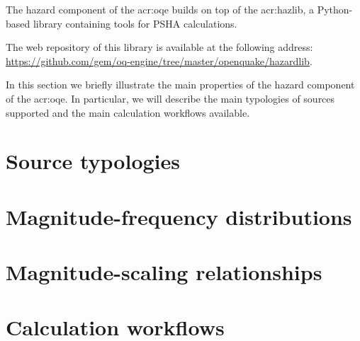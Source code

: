 
The hazard component of the \glsdesc{acr:oqe} builds on top of the
\gls{acr:hazlib}, a Python-based library containing tools for PSHA
calculations.

The web repository of this library is available at the following address:\\
\href{https://github.com/gem/oq-engine/tree/master/openquake/hazardlib}{https://github.com/gem/oq-engine/tree/master/openquake/hazardlib}.

In this section we briefly illustrate the main properties of the hazard
component of the \glsdesc{acr:oqe}. In particular, we will describe the main
typologies of sources supported and the main calculation workflows available.


\section{Source typologies}
\label{sec:source_typologies}


\section{Magnitude-frequency distributions}
\label{sec:mfd_list}


\section{Magnitude-scaling relationships}
\label{sec:msr_list}


\section{Calculation workflows}
\label{sec:hazard_calculators}
